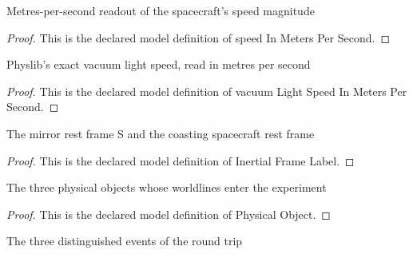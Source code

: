\begin{definition}
  \label{def:physics:phyx-mini-0528:phyxminiproblems-problemphyxmini0528-speedinmeterspersecond}
  Metres-per-second readout of the spacecraft's speed magnitude
\end{definition}
\begin{proof}
  This is the declared model definition of speed In Meters Per Second.
\end{proof}
\begin{definition}
  \label{def:physics:phyx-mini-0528:phyxminiproblems-problemphyxmini0528-vacuumlightspeedinmeterspersecond}
  Physlib's exact vacuum light speed, read in metres per second
\end{definition}
\begin{proof}
  This is the declared model definition of vacuum Light Speed In Meters Per Second.
\end{proof}
\begin{definition}
  \label{def:physics:phyx-mini-0528:phyxminiproblems-problemphyxmini0528-inertialframelabel}
  The mirror rest frame S and the coasting spacecraft rest frame
\end{definition}
\begin{proof}
  This is the declared model definition of Inertial Frame Label.
\end{proof}
\begin{definition}
  \label{def:physics:phyx-mini-0528:phyxminiproblems-problemphyxmini0528-physicalobject}
  The three physical objects whose worldlines enter the experiment
\end{definition}
\begin{proof}
  This is the declared model definition of Physical Object.
\end{proof}
\begin{definition}
  \label{def:physics:phyx-mini-0528:phyxminiproblems-problemphyxmini0528-eventlabel}
  The three distinguished events of the round trip
\end{definition}
